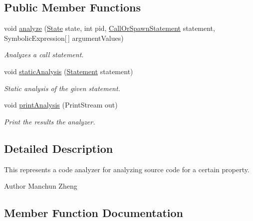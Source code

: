 \subsection*{Public Member Functions}
\begin{DoxyCompactItemize}
\item 
void \hyperlink{interfaceedu_1_1udel_1_1cis_1_1vsl_1_1civl_1_1analysis_1_1IF_1_1CodeAnalyzer_adadb1d504a23f54dff34214692116184}{analyze} (\hyperlink{interfaceedu_1_1udel_1_1cis_1_1vsl_1_1civl_1_1state_1_1IF_1_1State}{State} state, int pid, \hyperlink{interfaceedu_1_1udel_1_1cis_1_1vsl_1_1civl_1_1model_1_1IF_1_1statement_1_1CallOrSpawnStatement}{Call\+Or\+Spawn\+Statement} statement, Symbolic\+Expression\mbox{[}$\,$\mbox{]} argument\+Values)
\begin{DoxyCompactList}\small\item\em Analyzes a call statement. \end{DoxyCompactList}\item 
void \hyperlink{interfaceedu_1_1udel_1_1cis_1_1vsl_1_1civl_1_1analysis_1_1IF_1_1CodeAnalyzer_a28ee3910b374f9c74207d1b3238e11e1}{static\+Analysis} (\hyperlink{interfaceedu_1_1udel_1_1cis_1_1vsl_1_1civl_1_1model_1_1IF_1_1statement_1_1Statement}{Statement} statement)
\begin{DoxyCompactList}\small\item\em Static analysis of the given statement. \end{DoxyCompactList}\item 
void \hyperlink{interfaceedu_1_1udel_1_1cis_1_1vsl_1_1civl_1_1analysis_1_1IF_1_1CodeAnalyzer_a0b87629a9e6c5703ef5f03fac75a1ad8}{print\+Analysis} (Print\+Stream out)
\begin{DoxyCompactList}\small\item\em Print the results the analyzer. \end{DoxyCompactList}\end{DoxyCompactItemize}


\subsection{Detailed Description}
This represents a code analyzer for analyzing source code for a certain property. 

\begin{DoxyAuthor}{Author}
Manchun Zheng 
\end{DoxyAuthor}


\subsection{Member Function Documentation}
\hypertarget{interfaceedu_1_1udel_1_1cis_1_1vsl_1_1civl_1_1analysis_1_1IF_1_1CodeAnalyzer_adadb1d504a23f54dff34214692116184}{}
